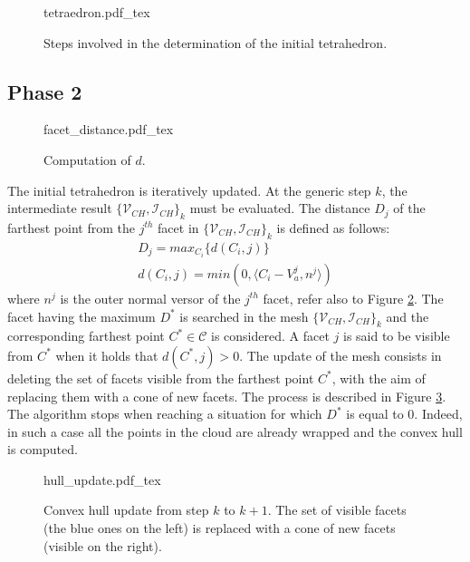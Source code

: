 \documentclass{article}
\begin{document}
\begin{figure}
	\centering
\def\svgwidth{0.95 \columnwidth}
{tetraedron.pdf_tex} 
	\caption{Steps involved in the determination of the initial tetrahedron. }
	\label{fig:tetraedro}
\end{figure} 



\subsection{Phase 2}
\label{sec:step_2}


\begin{figure}
	\centering
\def\svgwidth{0.25 \columnwidth}
{facet_distance.pdf_tex} 
	\caption{Computation of $d$. }
	\label{fig:facet_dist}
\end{figure}

The initial tetrahedron is iteratively updated. At the generic step $k$, the intermediate result $ \lbrace \mathcal{V}_{CH} , \mathcal{I}_{CH}  \rbrace _ {k}$ must be evaluated. The distance $D_j$ of the farthest point from the $j^{th}$ facet in $ \lbrace \mathcal{V}_{CH} , \mathcal{I}_{CH}  \rbrace _ {k}$ is defined as follows:
\begin{eqnarray}
D_j = max_{C_i} \lbrace d(C_i, j)  \rbrace \\
d(C_i, j) = min ( 0 ,\langle C_i - V_a^j , n^j \rangle )
\end{eqnarray}
where $n^j$ is the outer normal versor of the $j^{th}$ facet, refer also to Figure \ref{fig:facet_dist}. The facet having the maximum $D^{*}$ is searched in the mesh $ \lbrace \mathcal{V}_{CH} , \mathcal{I}_{CH}  \rbrace _ {k}$ and the corresponding farthest point $C^{*} \in \mathcal{C}$ is considered. A facet $j$ is said to be visible from $C^{*}$ when it holds that $d(C^{*}, j) > 0$.
The update of the mesh consists in deleting the set of facets visible from the farthest point $C^{*}$, with the aim of replacing them with a cone of new facets. The process is described in Figure \ref{fig:update}.
\\
The algorithm stops when reaching a situation for which $D^{*}$ is equal to 0. Indeed, in such a case all the points in the cloud are already wrapped and the convex hull is computed.

\begin{figure}
	\centering
\def\svgwidth{0.95 \columnwidth}
{hull_update.pdf_tex} 
	\caption{Convex hull update from step $k$ to $k+1$. The set of visible facets (the blue ones on the left) is replaced with a cone of new facets (visible on the right). }
	\label{fig:update}
\end{figure} 
\end{document}
